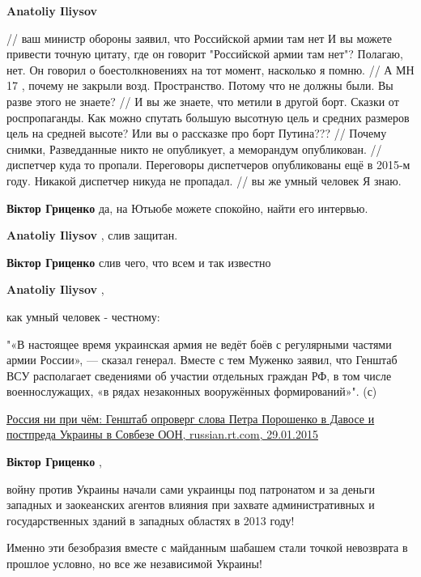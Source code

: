 \begin{itemize}
\begin{itemize}
\textbf{Anatoliy Iliysov} 

\obeycr
// ваш министр обороны заявил, что Российской армии там нет
И вы можете привести точную цитату, где он говорит "Российской армии там нет"? Полагаю, нет. Он говорил о боестолкновениях на тот момент, насколько я помню.
// А МН 17 , почему не закрыли возд. Пространство.
Потому что не должны были. Вы разве этого не знаете?
// И вы же знаете, что метили в другой борт.
Сказки от роспропаганды. Как можно спутать большую высотную цель и средних размеров цель на средней высоте? Или вы о рассказке про борт Путина???
// Почему снимки,
Разведданные никто не опубликует, а меморандум опубликован.
// диспетчер куда то пропали.
Переговоры диспетчеров опубликованы ещё в 2015-м году. Никакой диспетчер никуда не пропадал.
// вы же умный человек
Я знаю.
\restorecr

\textbf{Віктор Гриценко} да, на Ютьюбе можете спокойно, найти его интервью.

\textbf{Anatoliy Iliysov} , слив защитан.

\textbf{Віктор Гриценко} слив чего, что всем и так известно

\textbf{Anatoliy Iliysov} , 

как умный человек - честному:

"«В настоящее время украинская армия не ведёт боёв с регулярными частями армии
России», — сказал генерал. Вместе с тем Муженко заявил, что Генштаб ВСУ
располагает сведениями об участии отдельных граждан РФ, в том числе
военнослужащих, «в рядах незаконных вооружённых формирований»". (с)

\href{https://russian.rt.com/article/71368}{%
Россия ни при чём: Генштаб опроверг слова Петра Порошенко в Давосе и постпреда Украины в Совбезе ООН, %
russian.rt.com, 29.01.2015%
}

\textbf{Віктор Гриценко} ,

войну против Украины начали сами украинцы под патронатом и за деньги западных и
заокеанских агентов влияния при захвате административных и государственных
зданий в западных областях в 2013 году!

Именно эти безобразия вместе с майданным шабашем стали точкой невозврата в
прошлое условно, но все же независимой Украины!

\end{itemize} %

\end{itemize} %

